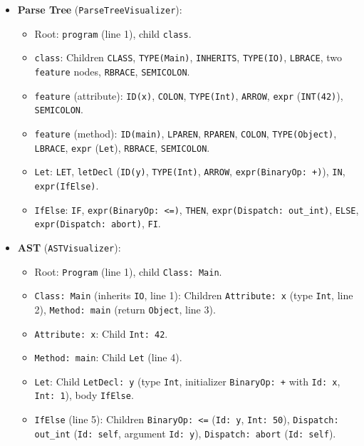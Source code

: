 \documentclass[11pt, titlepage]{article}
\begin{document}
\begin{itemize}[leftmargin=*]
    \item \textbf{Parse Tree} (\texttt{ParseTreeVisualizer}):
        \begin{itemize}
            \item Root: \texttt{program} (line 1), child \texttt{class}.
            \item \texttt{class}: Children \texttt{CLASS}, \texttt{TYPE(Main)}, \texttt{INHERITS}, \texttt{TYPE(IO)}, \texttt{LBRACE}, two \texttt{feature} nodes, \texttt{RBRACE}, \texttt{SEMICOLON}.
            \item \texttt{feature} (attribute): \texttt{ID(x)}, \texttt{COLON}, \texttt{TYPE(Int)}, \texttt{ARROW}, \texttt{expr} (\texttt{INT(42)}), \texttt{SEMICOLON}.
            \item \texttt{feature} (method): \texttt{ID(main)}, \texttt{LPAREN}, \texttt{RPAREN}, \texttt{COLON}, \texttt{TYPE(Object)}, \texttt{LBRACE}, \texttt{expr} (\texttt{Let}), \texttt{RBRACE}, \texttt{SEMICOLON}.
            \item \texttt{Let}: \texttt{LET}, \texttt{letDecl} (\texttt{ID(y)}, \texttt{TYPE(Int)}, \texttt{ARROW}, \texttt{expr(BinaryOp: +)}), \texttt{IN}, \texttt{expr(IfElse)}.
            \item \texttt{IfElse}: \texttt{IF}, \texttt{expr(BinaryOp: <=)}, \texttt{THEN}, \texttt{expr(Dispatch: out\_int)}, \texttt{ELSE}, \texttt{expr(Dispatch: abort)}, \texttt{FI}.
        \end{itemize}
    \item \textbf{AST} (\texttt{ASTVisualizer}):
        \begin{itemize}
            \item Root: \texttt{Program} (line 1), child \texttt{Class: Main}.
            \item \texttt{Class: Main} (inherits \texttt{IO}, line 1): Children \texttt{Attribute: x} (type \texttt{Int}, line 2), \texttt{Method: main} (return \texttt{Object}, line 3).
            \item \texttt{Attribute: x}: Child \texttt{Int: 42}.
            \item \texttt{Method: main}: Child \texttt{Let} (line 4).
            \item \texttt{Let}: Child \texttt{LetDecl: y} (type \texttt{Int}, initializer \texttt{BinaryOp: +} with \texttt{Id: x}, \texttt{Int: 1}), body \texttt{IfElse}.
            \item \texttt{IfElse} (line 5): Children \texttt{BinaryOp: <=} (\texttt{Id: y}, \texttt{Int: 50}), \texttt{Dispatch: out\_int} (\texttt{Id: self}, argument \texttt{Id: y}), \texttt{Dispatch: abort} (\texttt{Id: self}).

\end{itemize}
\end{itemize}
\end{document}
